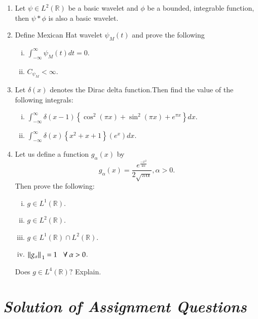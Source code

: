 \documentclass[12pt, a4paper]{article} %
\begin{document}
\begin{enumerate}
    \item Let $\psi \in L^2(\mathbb{R})$ be a basic wavelet and $\phi$ be a bounded, integrable function, then $\psi \ast \phi$ is also a basic wavelet.
    
    \item Define Mexican Hat wavelet $\displaystyle \psi_M (t)$ and prove the following
    \begin{enumerate}[(i)]
        \item $\displaystyle \int_{-\infty}^{\infty} \psi_M (t)dt = 0$.
        \item $\displaystyle C_{\psi_M} < \infty$.
    \end{enumerate}

    \item Let $\delta(x)$ denotes the Dirac delta function.Then find the value of the following integrals:
    \begin{enumerate}[(i)]
        \item $\displaystyle \int_{-\infty}^{\infty} \delta(x-1)\left\{\cos^2(\pi x) + \sin^2(\pi x) + e^{\pi x}\right\}dx$.
        \item $\displaystyle \int_{-\infty}^{\infty} \delta(x)\left\{x^2 + x + 1\right\}(e^x)dx$.
    \end{enumerate}

    \item Let us define a function $g_\alpha (x)$ by \[\displaystyle g_\alpha (x) = \frac{e^{\frac{-x^2}{4\alpha}}}{2\sqrt{\pi \alpha}}, \alpha > 0. \]
    \BgThispage
    Then prove the following:
    \begin{enumerate}[(i)]
        \item $\displaystyle g\in L^1 (\mathbb{R})$.
        \item $\displaystyle g\in L^2 (\mathbb{R})$.
        \item $\displaystyle g\in L^1(\mathbb{R}) \cap L^2(\mathbb{R})$.
        \item $\displaystyle \norm*{g_\alpha}_1 = 1\hspace*{0.3cm} \forall\ \alpha > 0$.
    \end{enumerate}
    Does $g\in L^4(\mathbb{R}) ?$ Explain.
\end{enumerate}

\pagebreak

\section{\slshape Solution of Assignment Questions}
\end{document}
